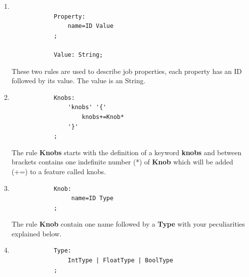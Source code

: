 \begin{enumerate}
    \item
		\singlespacing
		\begin{listing}[H]
		\begin{verbatim}

            Property:
                name=ID Value
            ;

            Value: String;
		\end{verbatim}
		\label{listing:modelRule}
		\end{listing}

        These two rules are used to describe job properties, each property has an
        ID followed by its value. The value is an String.

	\item
		\singlespacing
		\begin{listing}[H]
		\begin{verbatim}
			Knobs:
				'knobs' '{'
					knobs+=Knob*
				'}' 
			;
		\end{verbatim}
		\label{listing:modelRule}
		\end{listing}

		The rule \textbf{Knobs} starts with the definition of a keyword {\bf knobs}
		and between brackets contains one indefinite number (*) of \textbf{Knob}
		which will be added (+=) to a feature called knobs.

	\item
		\singlespacing
		\begin{listing}[H]
		\begin{verbatim}
			Knob:
				 name=ID Type
			;
		\end{verbatim}
		\label{listing:modelRule}
		\end{listing}

		The rule \textbf{Knob} contain one name followed by a \textbf{Type} with
		your peculiarities explained below.

	\item
		\singlespacing
		\begin{listing}[H]
		\begin{verbatim}
			Type:
				IntType | FloatType | BoolType
			;
		\end{verbatim}
		\label{listing:modelRule}
		\end{listing}


\end{enumerate}

